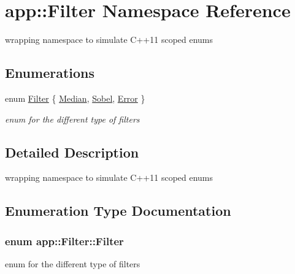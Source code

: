 \hypertarget{namespaceapp_1_1_filter}{}\section{app\+:\+:Filter Namespace Reference}
\label{namespaceapp_1_1_filter}


wrapping namespace to simulate C++11 scoped enums  


\subsection*{Enumerations}
\begin{DoxyCompactItemize}
\item 
enum \hyperlink{namespaceapp_1_1_filter_a2945c335b9c131d8983b181e876d7b00}{Filter} \{ \hyperlink{namespaceapp_1_1_filter_a2945c335b9c131d8983b181e876d7b00a8ac753cf25baff3e8f119fe1f4efb75b}{Median}, 
\hyperlink{namespaceapp_1_1_filter_a2945c335b9c131d8983b181e876d7b00a71da1a6fbbd8cc6456e60b3ac0a7dda8}{Sobel}, 
\hyperlink{namespaceapp_1_1_filter_a2945c335b9c131d8983b181e876d7b00a8b153cc7123f87983853b1553d42332e}{Error}
 \}\begin{DoxyCompactList}\small\item\em enum for the different type of filters \end{DoxyCompactList}
\end{DoxyCompactItemize}


\subsection{Detailed Description}
wrapping namespace to simulate C++11 scoped enums 

\subsection{Enumeration Type Documentation}
\hypertarget{namespaceapp_1_1_filter_a2945c335b9c131d8983b181e876d7b00}{}
\subsubsection[{Filter}]{\setlength{\rightskip}{0pt plus 5cm}enum {\bf app\+::\+Filter\+::\+Filter}}\label{namespaceapp_1_1_filter_a2945c335b9c131d8983b181e876d7b00}


enum for the different type of filters 

